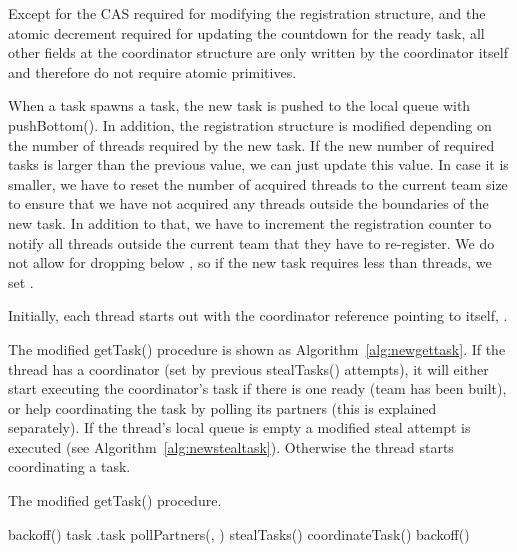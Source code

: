 \documentclass[preprint]{sigplanconf}
\begin{document}
Except for the CAS required for modifying the registration structure,
and the atomic decrement required for updating the countdown  for
the ready task, all other fields at the coordinator structure are only
written by the coordinator itself and therefore do not require atomic
primitives.

When a task spawns a task, the new task is pushed to the local queue
with pushBottom(). In addition, the registration structure is modified
depending on the number of threads required by the new task. If the
new number of required tasks  is larger than the previous value, we
can just update this value. In case it is smaller, we have to reset
the number of acquired threads  to the current team size  to
ensure that we have not acquired any threads outside the boundaries of
the new task. In addition to that, we have to increment the
registration counter to notify all threads outside the current team
that they have to re-register. We do not allow for  dropping below
, so if the new task requires less than  threads, we set .

Initially, each thread starts out with the coordinator reference
pointing to itself, .

The modified getTask() procedure is shown as
Algorithm~\ref{alg:newgettask}.  If the thread has a coordinator  (set by previous stealTasks() attempts), it
will either start executing the coordinator's task if there is one
ready (team has been built), or help coordinating the task by polling
its partners (this is explained separately).  If the thread's local queue
is empty a modified steal attempt is executed (see
Algorithm~\ref{alg:newstealtask}).  Otherwise the thread starts
coordinating a task.

\begin{algorithm}
\caption{The modified getTask() procedure.}\label{alg:newgettask}
\begin{algorithmic}[1]
\WHILE {}
	\STATE {}
	\STATE backoff()
\ENDWHILE
\STATE task  
\REPEAT
\IF {}
	\STATE {}
		\STATE {}
		\RETURN .task
	\ELSE
		\STATE pollPartners(, )
	\ENDIF
{}
	\STATE stealTasks()
\ELSE
	\STATE coordinateTask()
		\STATE backoff()
	\ENDIF
\ENDIF	
{}
\end{algorithmic}
\end{algorithm}
\end{document}

